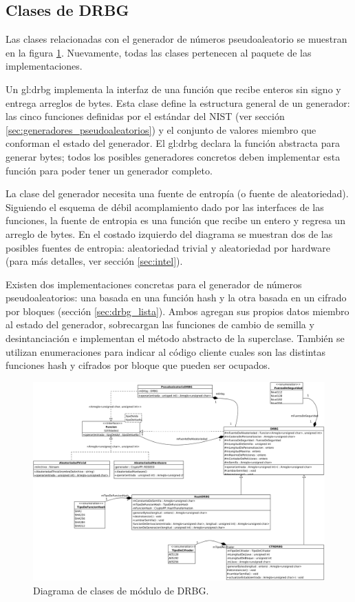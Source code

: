 %
%
%

\subsection{Clases de DRBG}
\label{sec:drbg_disenio}

Las clases relacionadas con el generador de números pseudoaleatorio se muestran
en la figura \ref{clases_drbg}. Nuevamente, todas las clases pertenecen al
paquete de las implementaciones.

Un \gls{gl:drbg} implementa la interfaz de una función que recibe enteros sin
signo y entrega arreglos de bytes. Esta clase define la estructura general de un
generador: las cinco funciones definidas por el estándar del NIST (ver sección
\ref{sec:generadores_pseudoaleatorios}) y el conjunto de valores miembro que
conforman el estado del generador. El \gls{gl:drbg} declara la función abstracta
para generar bytes; todos los posibles generadores concretos deben implementar
esta función para poder tener un generador completo.

La clase del generador necesita una fuente de entropía (o fuente de
aleatoriedad). Siguiendo el esquema de débil acomplamiento dado por las
interfaces de las funciones, la fuente de entropia es una función que recibe un
entero y regresa un arreglo de bytes. En el costado izquierdo del diagrama se
muestran dos de las posibles fuentes de entropia: aleatoriedad trivial y
aleatoriedad por hardware (para más detalles, ver sección \ref{sec:intel}).

Existen dos implementaciones concretas para el generador de números
pseudoaleatorios: una basada en una función hash y la otra basada en un cifrado
por bloques (sección \ref{sec:drbg_lista}). Ambos agregan sus propios datos
miembro al estado del generador, sobrecargan las funciones de cambio de semilla
y desintanciación e implementan el método abstracto de la superclase. También se
utilizan enumeraciones para indicar al código cliente cuales son las distintas
funciones hash y cifrados por bloque que pueden ser ocupados.

\begin{figure}
  \begin{center}
    \includegraphics[width=0.8\linewidth]{diagramas/drbg.png}
    \caption{Diagrama de clases de módulo de DRBG.}
    \label{clases_drbg}
  \end{center}
\end{figure}
